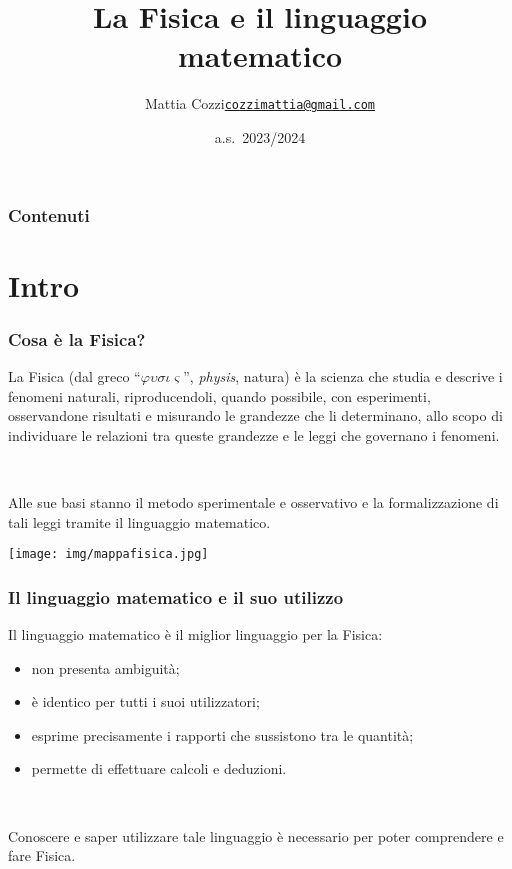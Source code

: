 \documentclass[]{beamer}
\title{La Fisica e il linguaggio matematico}
\author{\texorpdfstring{Mattia Cozzi\newline\href{mailto:cozzimattia@gmail.com}{\texttt{cozzimattia@gmail.com}}}{Mattia Cozzi}}
\date{a.s.~2023/2024}
\begin{document}
\begin{frame}
  \titlepage
\end{frame}





\begin{frame}
\frametitle{Contenuti}
\tableofcontents
\end{frame}

\section{Intro}


\begin{frame}
\frametitle{Cosa è la Fisica?}
La Fisica (dal greco ``$ \varphi \upsilon \sigma \iota \varsigma $'', \emph{physis}, natura) è la scienza che \alert<1>{studia e descrive i fenomeni naturali},{\pause} riproducendoli, quando possibile, con \alert<2>{esperimenti},{\pause} osservandone risultati e \alert<3>{misurando le grandezze} che li determinano,{\pause} allo scopo di individuare le relazioni tra queste grandezze e \alert<4>{le leggi che governano i fenomeni}.{\pause}

~

Alle sue basi stanno il \alert<5>{metodo sperimentale} e osservativo{\pause} e la formalizzazione di tali leggi tramite il \alert<6>{linguaggio matematico}.
\end{frame}


\begin{frame}
\texttt{[image: img/mappafisica.jpg]}
\end{frame}




\begin{frame}
\frametitle{Il linguaggio matematico e il suo utilizzo}
Il linguaggio matematico è il miglior linguaggio per la Fisica:
\begin{itemize}
  \item \alert<1>{non presenta ambiguità};\pause
  \item \alert<2>{è identico per tutti} i suoi utilizzatori;\pause
  \item esprime precisamente \alert<3>{i rapporti che sussistono tra le quantità};\pause
  \item permette di effettuare \alert<4>{calcoli e deduzioni}.\pause
\end{itemize}

~

Conoscere e saper utilizzare tale linguaggio è necessario per poter comprendere e fare Fisica.
\end{frame}
\end{document}
